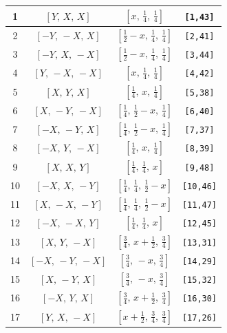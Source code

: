 \documentclass[fleqn,8pt]{jsarticle}
\begin{document}
\begin{longtable}{cccc}
1 & $\left[ Y,\, X,\, X \right]$ & $\left[ x,\, \frac{1}{4},\, \frac{1}{4} \right]$ & {\tt [1,43]} \\ \hline
2 & $\left[ - Y,\, - X,\, X \right]$ & $\left[ \frac{1}{2} - x,\, \frac{1}{4},\, \frac{1}{4} \right]$ & {\tt [2,41]} \\ \hline
3 & $\left[ - Y,\, X,\, - X \right]$ & $\left[ \frac{1}{2} - x,\, \frac{1}{4},\, \frac{1}{4} \right]$ & {\tt [3,44]} \\ \hline
4 & $\left[ Y,\, - X,\, - X \right]$ & $\left[ x,\, \frac{1}{4},\, \frac{1}{4} \right]$ & {\tt [4,42]} \\ \hline
5 & $\left[ X,\, Y,\, X \right]$ & $\left[ \frac{1}{4},\, x,\, \frac{1}{4} \right]$ & {\tt [5,38]} \\ \hline
6 & $\left[ X,\, - Y,\, - X \right]$ & $\left[ \frac{1}{4},\, \frac{1}{2} - x,\, \frac{1}{4} \right]$ & {\tt [6,40]} \\ \hline
7 & $\left[ - X,\, - Y,\, X \right]$ & $\left[ \frac{1}{4},\, \frac{1}{2} - x,\, \frac{1}{4} \right]$ & {\tt [7,37]} \\ \hline
8 & $\left[ - X,\, Y,\, - X \right]$ & $\left[ \frac{1}{4},\, x,\, \frac{1}{4} \right]$ & {\tt [8,39]} \\ \hline
9 & $\left[ X,\, X,\, Y \right]$ & $\left[ \frac{1}{4},\, \frac{1}{4},\, x \right]$ & {\tt [9,48]} \\ \hline
10 & $\left[ - X,\, X,\, - Y \right]$ & $\left[ \frac{1}{4},\, \frac{1}{4},\, \frac{1}{2} - x \right]$ & {\tt [10,46]} \\ \hline
11 & $\left[ X,\, - X,\, - Y \right]$ & $\left[ \frac{1}{4},\, \frac{1}{4},\, \frac{1}{2} - x \right]$ & {\tt [11,47]} \\ \hline
12 & $\left[ - X,\, - X,\, Y \right]$ & $\left[ \frac{1}{4},\, \frac{1}{4},\, x \right]$ & {\tt [12,45]} \\ \hline
13 & $\left[ X,\, Y,\, - X \right]$ & $\left[ \frac{3}{4},\, x + \frac{1}{2},\, \frac{3}{4} \right]$ & {\tt [13,31]} \\ \hline
14 & $\left[ - X,\, - Y,\, - X \right]$ & $\left[ \frac{3}{4},\, - x,\, \frac{3}{4} \right]$ & {\tt [14,29]} \\ \hline
15 & $\left[ X,\, - Y,\, X \right]$ & $\left[ \frac{3}{4},\, - x,\, \frac{3}{4} \right]$ & {\tt [15,32]} \\ \hline
16 & $\left[ - X,\, Y,\, X \right]$ & $\left[ \frac{3}{4},\, x + \frac{1}{2},\, \frac{3}{4} \right]$ & {\tt [16,30]} \\ \hline
17 & $\left[ Y,\, X,\, - X \right]$ & $\left[ x + \frac{1}{2},\, \frac{3}{4},\, \frac{3}{4} \right]$ & {\tt [17,26]} \\ \hline

\end{longtable}
\end{document}
